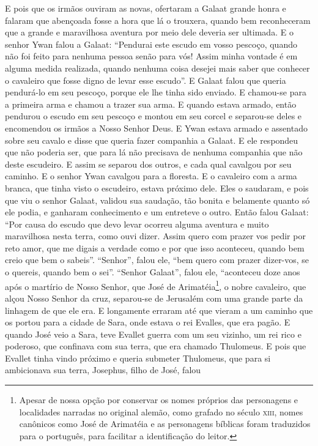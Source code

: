E pois que os irmãos ouviram as novas, ofertaram a Galaat grande honra e falaram
que abençoada fosse a hora que lá o trouxera, quando bem reconheceram que a
grande e maravilhosa aventura por meio dele deveria ser ultimada. E o
senhor Ywan falou a Galaat: “Pendurai este escudo em vosso pescoço, quando não
foi feito para nenhuma pessoa senão para vós! Assim minha vontade é em alguma
medida realizada, quando nenhuma coisa desejei mais saber que conhecer o
cavaleiro que fosse digno de levar esse escudo”. E Galaat falou que queria
pendurá-lo em seu pescoço, porque ele lhe tinha sido enviado. E chamou-se para
a primeira arma e chamou a trazer sua arma. E quando estava armado, então
pendurou o escudo em seu pescoço e montou em seu corcel e separou-se deles e
encomendou os irmãos a Nosso Senhor Deus. E Ywan estava armado e assentado
sobre seu cavalo e disse que queria fazer companhia a Galaat. E ele respondeu
que não poderia ser, que para lá não precisava de nenhuma companhia que não
deste escudeiro. E assim se separou dos outros, e cada qual cavalgou por seu
caminho. E o senhor Ywan cavalgou para a floresta. E o cavaleiro com a arma
branca, que tinha visto o escudeiro, estava próximo dele. Eles o saudaram, e
pois que viu o senhor Galaat, validou sua saudação, tão bonita e belamente
quanto só ele podia, e ganharam conhecimento e um entreteve o outro. Então
falou Galaat: “Por causa do escudo que devo levar ocorreu alguma aventura e
muito maravilhosa nesta terra, como ouvi dizer. Assim quero com prazer vos
pedir por reto amor, que me digais a verdade como e por que isso aconteceu,
quando bem creio que bem o sabeis”. “Senhor”, falou ele, “bem quero com prazer
dizer-vos, se o quereis, quando bem o sei”. “Senhor Galaat”, falou ele,
“aconteceu doze anos após o martírio de Nosso Senhor, que José de
Arimatéia\footnote{ Apesar de nossa opção por conservar os nomes próprios das
personagens e localidades narradas no original alemão, como grafado no século
\textsc{xiii}, nomes canônicos como José de Arimatéia e as personagens bíblicas foram
traduzidos para o português, para facilitar a identificação do leitor.}, 
o nobre cavaleiro, que alçou Nosso Senhor da cruz, separou-se de
Jerusalém com uma grande parte da linhagem de que ele era. E longamente erraram
até que vieram a um caminho que os portou para a cidade de Sara, onde estava o
rei Evalles, que era pagão. E quando José veio a Sara, teve Evallet guerra com
um seu vizinho, um rei rico e poderoso, que confinava com sua terra, que era
chamado Thulomeus. E pois que Evallet tinha vindo próximo e queria submeter
Thulomeus, que para si ambicionava sua terra, Josephus, filho de José, falou
